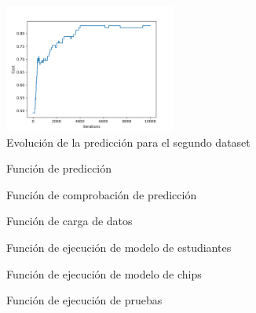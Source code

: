 \documentclass[6pt]{AiTex}
\begin{document}
\begin{figure}[H]
    \centering
    \includegraphics[width=0.5\textwidth]{./imagenes/muestreo2_accuracy.png}
    \caption{Evolución de la predicción para el segundo dataset}
    \label{fig:prediction_evolution2}
\end{figure}

\begin{figure}[H]
    \centering
    
    \caption{Función de predicción}
    \label{fig:predict}
\end{figure}

\begin{figure}[H]
    \centering
    
    \caption{Función de comprobación de predicción}
    \label{fig:predict_check}
\end{figure}

\begin{figure}[H]
    \centering
    
    \caption{Función de carga de datos}
    \label{fig:load_data}
\end{figure}

\begin{figure}[H]
    \centering
    
    \caption{Función de ejecución de modelo de estudiantes}
    \label{fig:run_student_sim}
\end{figure}

\begin{figure}[H]
    \centering
    
    \caption{Función de ejecución de modelo de chips}
    \label{fig:run_chip_sim}
\end{figure}

\begin{figure}[H]
    \centering
    
    \caption{Función de ejecución de pruebas}
    \label{fig:run_tests}
\end{figure}
\end{document}
